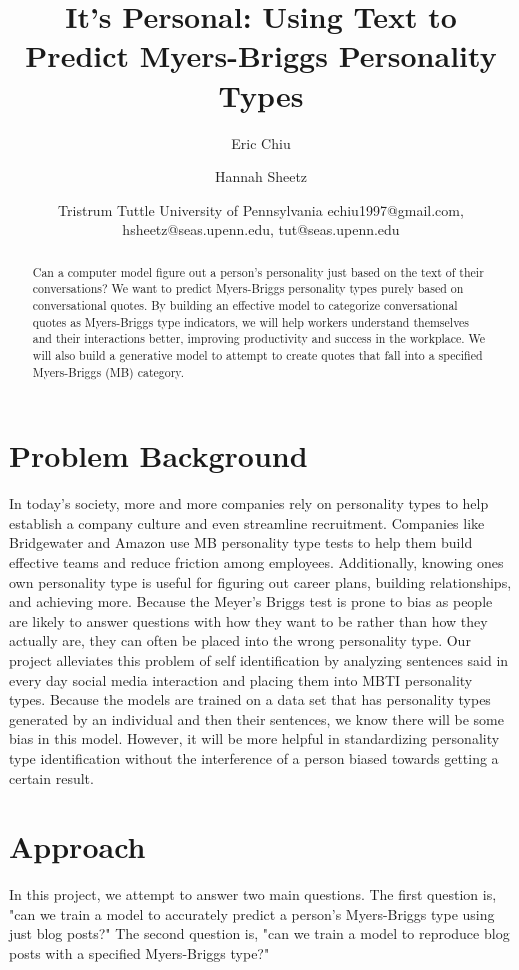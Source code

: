 \documentclass{article}
\title{It's Personal: Using Text to Predict Myers-Briggs Personality Types}
\author{
Eric Chiu\and
Hannah Sheetz\and
Tristrum Tuttle
\affiliations
University of Pennsylvania
\emails
echiu1997@gmail.com, hsheetz@seas.upenn.edu, tut@seas.upenn.edu
}
\begin{document}
\maketitle

\begin{abstract}
Can a computer model figure out a person's personality just based on the text of their conversations? We want to predict Myers-Briggs personality types purely based on conversational quotes. By building an effective model to categorize conversational quotes as Myers-Briggs type indicators, we will help workers understand themselves and their interactions better, improving productivity and success in the workplace. We will also build a generative model to attempt to create quotes that fall into a specified Myers-Briggs (MB) category.
\end{abstract}

\section{Problem Background}
In today's society, more and more companies rely on personality types to help establish a company culture and even streamline recruitment. Companies like Bridgewater and Amazon use MB personality type tests to help them build effective teams and reduce friction among employees. Additionally, knowing ones own personality type is useful for figuring out career plans, building relationships, and achieving more. Because the Meyer's Briggs test is prone to bias as people are likely to answer questions with how they want to be rather than how they actually are, they can often be placed into the wrong personality type. Our project alleviates this problem of self identification by analyzing sentences said in every day social media interaction and placing them into MBTI personality types. Because the models are trained on a data set that has personality types generated by an individual and then their sentences, we know there will be some bias in this model. However, it will be more helpful in standardizing personality type identification without the interference of a person biased towards getting a certain result. 

\section{Approach}
In this project, we attempt to answer two main questions. The first question is, "can we train a model to accurately predict a person's Myers-Briggs type using just blog posts?" The second question is, "can we train a model to reproduce blog posts with a specified Myers-Briggs type?" 
\end{document}
